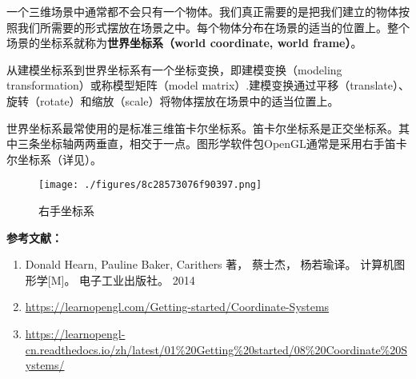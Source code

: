 


一个三维场景中通常都不会只有一个物体。我们真正需要的是把我们建立的物体按照我们所需要的形式摆放在场景之中。每个物体分布在场景的适当的位置上。整个场景的坐标系就称为\textbf{世界坐标系（world coordinate, world frame）}。

从建模坐标系到世界坐标系有一个坐标变换，即建模变换（modeling transformation）或称模型矩阵（model matrix）.建模变换通过平移（translate）、旋转（rotate）和缩放（scale）将物体摆放在场景中的适当位置上。

世界坐标系最常使用的是标准三维笛卡尔坐标系。笛卡尔坐标系是正交坐标系。其中三条坐标轴两两垂直，相交于一点。图形学软件包OpenGL通常是采用右手笛卡尔坐标系（详见）。


\begin{figure}[ht]
\centering
\texttt{[image: ./figures/8c28573076f90397.png]}
\caption{右手坐标系} \label{fig_Worcod_1}
\end{figure}


\textbf{参考文献：}
\begin{enumerate}
\item Donald Hearn, Pauline Baker, Carithers 著， 蔡士杰， 杨若瑜译。 计算机图形学[M]。 电子工业出版社。 2014
\item \href{https://learnopengl.com/Getting-started/Coordinate-Systems}{https://learnopengl.com/Getting-started/Coordinate-Systems}
\item \href{https://learnopengl-cn.readthedocs.io/zh/latest/01\%20Getting\%20started/08\%20Coordinate\%20Systems/}{https://learnopengl-cn.readthedocs.io/zh/latest/01\%20Getting\%20started/08\%20Coordinate\%20Systems/}
\end{enumerate}

